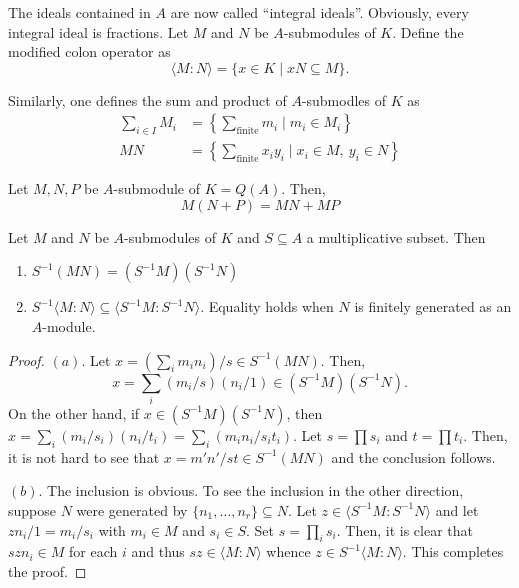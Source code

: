 The ideals contained in $A$ are now called ``integral ideals''. Obviously, every integral ideal is fractions. Let $M$ and $N$ be $A$-submodules of $K$. Define the modified colon operator as 
\begin{equation*}
    \langle M: N\rangle = \{x\in K\mid xN\subseteq M\}.
\end{equation*}

Similarly, one defines the sum and product of $A$-submodles of $K$ as 
\begin{align*}
    \sum_{i\in I}M_i &= \left\{\sum_{\text{finite}}m_i\mid m_i\in M_i\right\}\\
    MN &= \left\{\sum_{\text{finite}}x_iy_i\mid x_i\in M,~y_i\in N\right\}
\end{align*}

\begin{proposition}
    Let $M, N, P$ be $A$-submodule of $K = Q(A)$. Then, 
    \begin{equation*}
        M(N + P) = MN + MP
    \end{equation*}
\end{proposition}

\begin{proposition}
    Let $M$ and $N$ be $A$-submodules of $K$ and $S\subseteq A$ a multiplicative subset. Then 
    \begin{enumerate}[label=(\alph*)]
        \item $S^{-1}(MN) = (S^{-1}M)(S^{-1}N)$
        \item $S^{-1}\langle M:N\rangle\subseteq\langle S^{-1}M : S^{-1}N\rangle$. Equality holds when $N$ is finitely generated as an $A$-module.
    \end{enumerate}
\end{proposition}
\begin{proof}
    $(a)$. Let $x = (\sum_i m_in_i)/s\in S^{-1}(MN)$. Then, 
    \begin{equation*}
        x = \sum_{i}(m_i/s)(n_i/1)\in (S^{-1}M)(S^{-1}N).
    \end{equation*}
    On the other hand, if $x\in (S^{-1}M)(S^{-1}N)$, then $x = \sum_i(m_i/s_i)(n_i/t_i) = \sum_i (m_in_i/s_it_i)$. Let $s = \prod s_i$ and $t = \prod t_i$. Then, it is not hard to see that $x = m'n'/st\in S^{-1}(MN)$ and the conclusion follows. 

    $(b)$. The inclusion is obvious. To see the inclusion in the other direction, suppose $N$ were generated by $\{n_1,\dots,n_r\}\subseteq N$. Let $z\in\langle S^{-1}M : S^{-1}N\rangle$ and let $zn_i/1 = m_i/s_i$ with $m_i\in M$ and $s_i\in S$. Set $s = \prod_{i} s_i$. Then, it is clear that $szn_i\in M$ for each $i$ and thus $sz\in\langle M: N\rangle$ whence $z\in S^{-1}\langle M: N\rangle$. This completes the proof.
\end{proof}


